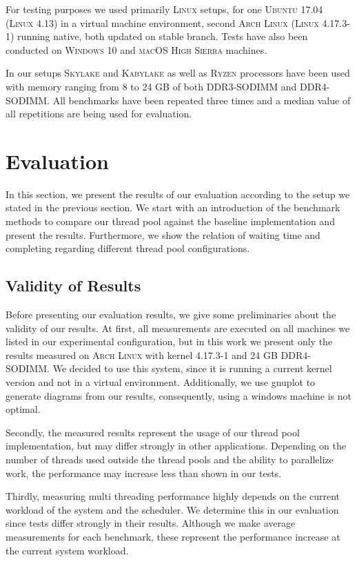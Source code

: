 \documentclass[conference]{IEEEtran}
\begin{document}
For testing purposes we used primarily \textsc{Linux} setups, for one \textsc{Ubuntu} 17.04
(\textsc{Linux} 4.13) in a virtual machine environment, second \textsc{Arch Linux} (\textsc{Linux}
4.17.3-1) running native, both updated on stable branch. Tests have also been
conducted on \textsc{Windows 10} and \textsc{macOS High Sierra} machines.

In our setups \textsc{Skylake} and \textsc{Kabylake} as well as \textsc{Ryzen} processors have been used with memory
ranging from 8 to 24 GB of both DDR3-SODIMM and DDR4-SODIMM. 
All benchmarks have been repeated three times and a median value of all
repetitions are being used for evaluation.

\section{Evaluation}\label{sec:eval}
In this section, we present the results of our evaluation according to the setup we stated in the previous section. We start with an introduction of the benchmark methods to compare our thread pool against the baseline implementation and present the results. Furthermore, we show the relation of waiting time and completing regarding different thread pool configurations.

\subsection{Validity of Results} 
Before presenting our evaluation results, we
give some preliminaries about the validity of our results. At first, all
measurements are executed on all machines we listed in our experimental
configuration, but in this work we present only the results measured on
\textsc{Arch} \textsc{Linux} with kernel 4.17.3-1 and 24 GB DDR4-SODIMM. We decided to use this
system, since it is running a current kernel version and not in a virtual
environment. Additionally, we use gnuplot to generate diagrams from our results,
consequently, using a windows machine is not optimal.

Secondly, the measured results represent the usage of our thread pool implementation, but may differ strongly in other applications. Depending on the number of threads used outside the thread pools and the ability to parallelize work, the performance may increase less than shown in our tests.

Thirdly, measuring multi threading performance highly depends on the current workload of the system and the scheduler. We determine this in our evaluation since tests differ strongly in their results. Although we make average measurements for each benchmark, these represent the performance increase at the current system workload.
\end{document}
